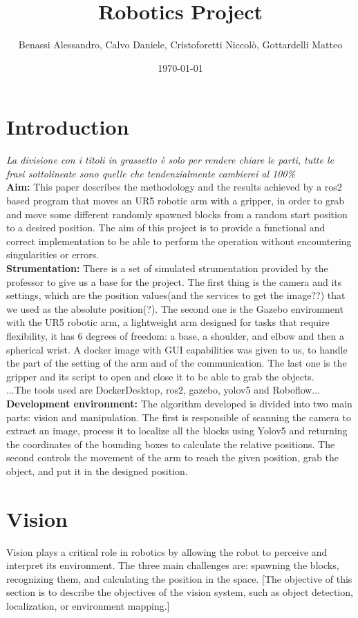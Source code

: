 \documentclass[12pt,a4paper]{article}
\title{Robotics Project}
\author{Benassi Alessandro, Calvo Daniele, Cristoforetti Niccolò, Gottardelli Matteo}
\date{\today}
\begin{document}
\maketitle
\tableofcontents
\newpage

\section{Introduction}\label{sec:intro}
\textit{La divisione con i titoli in grassetto è solo per rendere chiare le parti, tutte le frasi sottolineate sono quelle che tendenzialmente cambierei al 100\%}\\
\textbf{Aim:} This paper describes the methodology and the results achieved by a ros2 based program that moves an UR5 robotic arm with a gripper, in order to grab and move some different randomly spawned blocks from a random start position to a desired position. The aim of this project is to provide a functional and correct implementation to be able to perform the operation without encountering singularities or errors.\\
\textbf{Strumentation:} There is a set of simulated strumentation provided by the professor to give us a base for the project. The first thing is the camera and its settings, which are the position values(and the services to get the image??) that we used as the absolute position(?). The second one is the Gazebo environment with the UR5 robotic arm, a lightweight arm designed for tasks that require flexibility, it has 6 degrees of freedom: a base, a shoulder, and elbow and then a spherical wrist. A docker image with GUI capabilities was given to us, to handle the part of the setting of the arm and of the communication. The last one is the gripper and its script to open and close it to be able to grab the objects.\\
...The tools used are DockerDesktop, ros2, gazebo, yolov5 and Roboflow...\\
\textbf{Development environment:} The algorithm developed is divided into two main parts: vision and manipulation. The first is responsible of scanning the camera to extract an image, process it to localize all the blocks using Yolov5 and returning the coordinates of the bounding boxes to calculate the relative positions. The second controls the movement of the arm to reach the given position, grab the object, and put it in the designed position.


\section{Vision}\label{sec:vision}
Vision plays a critical role in robotics by allowing the robot to perceive and interpret its environment. 
The three main challenges are: spawning the blocks, recognizing them, and calculating the position in the space. 
[The objective of this section is to describe the objectives of the vision system, such as object detection, localization, or environment mapping.]
\end{document}
